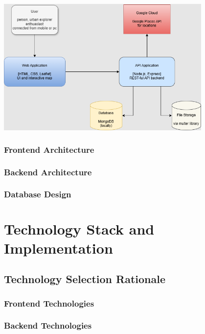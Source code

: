 \documentclass[12pt,a4paper]{report}
\begin{document}
\begin{center}
\includegraphics[width=0.8\textwidth]{images/licenta.drawio.png}
\end{center}

\subsection{Frontend Architecture}

\subsection{Backend Architecture}

\subsection{Database Design}

\chapter{Technology Stack and Implementation}
\section{Technology Selection Rationale}
\subsection{Frontend Technologies}

\subsection{Backend Technologies}
\end{document}
